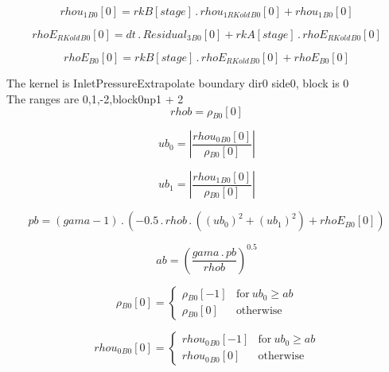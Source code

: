 \documentclass{article}
\begin{document}
\begin{dmath}{rhou_{1}{_{B0}}}[{0}] = {rkB}[{stage}] \,.\, {rhou_{1 RKold}{_{B0}}}[{0}] + {rhou_{1}{_{B0}}}[{0}]\end{dmath}

\begin{dmath}{rhoE_{RKold}{_{B0}}}[{0}] = dt \,.\, {Residual_{3}{_{B0}}}[{0}] + {rkA}[{stage}] \,.\, {rhoE_{RKold}{_{B0}}}[{0}]\end{dmath}

\begin{dmath}{rhoE{_{B0}}}[{0}] = {rkB}[{stage}] \,.\, {rhoE_{RKold}{_{B0}}}[{0}] + {rhoE{_{B0}}}[{0}]\end{dmath}

\noindent The kernel is InletPressureExtrapolate boundary dir0 side0, block is 0\\\noindent The ranges are 0,1,-2,block0np1 + 2\\\begin{dmath}rhob = {\rho{_{B0}}}[{0}]\end{dmath}

\begin{dmath}ub_{0} = \left|{\frac{{rhou_{0}{_{B0}}}[{0}]}{{\rho{_{B0}}}[{0}]}}\right|\end{dmath}

\begin{dmath}ub_{1} = \left|{\frac{{rhou_{1}{_{B0}}}[{0}]}{{\rho{_{B0}}}[{0}]}}\right|\end{dmath}

\begin{dmath}pb = \left(gama - 1\right) \,.\, \left(- 0.5 \,.\, rhob \,.\, \left(\left(ub_{0} \right)^{2} + \left(ub_{1} \right)^{2}\right) + {rhoE{_{B0}}}[{0}]\right)\end{dmath}

\begin{dmath}ab = \left(\frac{gama \,.\, pb}{rhob} \right)^{0.5}\end{dmath}

\begin{dmath}{\rho{_{B0}}}[{0}] = \begin{cases} {\rho{_{B0}}}[{-1}] & \text{for}\: ub_{0} \geq ab \\{\rho{_{B0}}}[{0}] & \text{otherwise} \end{cases}\end{dmath}

\begin{dmath}{rhou_{0}{_{B0}}}[{0}] = \begin{cases} {rhou_{0}{_{B0}}}[{-1}] & \text{for}\: ub_{0} \geq ab \\{rhou_{0}{_{B0}}}[{0}] & \text{otherwise} \end{cases}\end{dmath}
\end{document}
